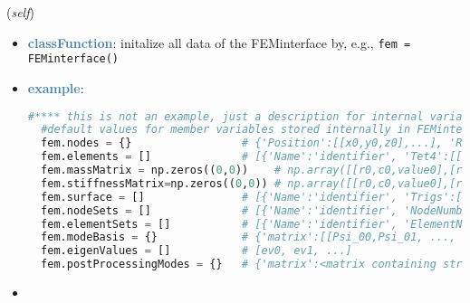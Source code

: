 \begin{itemize}[leftmargin=1.4cm]
\begin{itemize}[leftmargin=1.4cm]
\begin{itemize}[leftmargin=0.5cm]
\begin{itemize}[leftmargin=1.4cm]
\begin{itemize}[leftmargin=1.4cm]
\begin{itemize}[leftmargin=0.5cm]
\begin{flushleft}
({\it self})
\end{flushleft}
\setlength{\itemindent}{0.7cm}
\begin{itemize}[leftmargin=0.7cm]
\item[--]\textcolor{steelblue}{\bf classFunction}: initalize all data of the FEMinterface by, e.g., \texttt{fem = FEMinterface()}
\item[--]\textcolor{steelblue}{\bf example}: \vspace{-12pt}\ei\begin{lstlisting}[language=Python, xleftmargin=36pt]
  #**** this is not an example, just a description for internal variables ****
  #default values for member variables stored internally in FEMinterface fem and typical structure:
  fem.nodes = {}                 # {'Position':[[x0,y0,z0],...], 'RigidBodyRxyz':[[x0,y0,z0],...],  },...]                     #dictionary of different node lists
  fem.elements = []              # [{'Name':'identifier', 'Tet4':[[n0,n1,n2,n3],...], 'Hex8':[[n0,...,n7],...],  },...]        #there may be several element sets
  fem.massMatrix = np.zeros((0,0))    # np.array([[r0,c0,value0],[r1,c1,value1], ... ])                                #currently only in SparseCSR format allowed!
  fem.stiffnessMatrix=np.zeros((0,0)) # np.array([[r0,c0,value0],[r1,c1,value1], ... ])                                #currently only in SparseCSR format allowed!
  fem.surface = []               # [{'Name':'identifier', 'Trigs':[[n0,n1,n2],...], 'Quads':[[n0,...,n3],...],  },...]           #surface with faces
  fem.nodeSets = []              # [{'Name':'identifier', 'NodeNumbers':[n_0,...,n_ns], 'NodeWeights':[w_0,...,w_ns]},...]     #for boundary conditions, etc.
  fem.elementSets = []           # [{'Name':'identifier', 'ElementNumbers':[n_0,...,n_ns]},...]                                #for different volumes, etc.
  fem.modeBasis = {}             # {'matrix':[[Psi_00,Psi_01, ..., Psi_0m],...,[Psi_n0,Psi_n1, ..., Psi_nm]],'type':'NormalModes'} #'NormalModes' are eigenmodes, 'HCBmodes' are Craig-Bampton modes including static modes
  fem.eigenValues = []           # [ev0, ev1, ...]                                                                             #eigenvalues according to eigenvectors in mode basis
  fem.postProcessingModes = {}   # {'matrix':<matrix containing stress components (xx,yy,zz,yz,xz,xy) in each column, rows are for every mesh node>,'outputVariableType':exudyn.OutputVariableType.StressLocal}
\end{lstlisting}\vspace{-24pt}\bi\item[]\vspace{-24pt}\vspace{12pt}\end{itemize}

\end{itemize}
\end{itemize}
\end{itemize}
\end{itemize}
\end{itemize}
\end{itemize}
